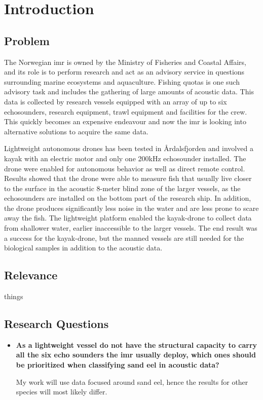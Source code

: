 \chapter{Introduction}


    \section{Problem}
    
    
    
    The Norwegian \gls{imr} is owned by the Ministry of Fisheries and Coastal Affairs, and its role is to perform research and act as an advisory service in questions surrounding marine ecosystems and aquaculture\cite{IMR}. Fishing quotas is one such advisory task and includes the gathering of large amounts of acoustic data. This data is collected by research vessels\cite{IMR-vessels} equipped with an array of up to six echosounders, research equipment, trawl equipment and facilities for the crew. This quickly becomes an expensive endeavour and now the \gls{imr} is looking into alternative solutions to acquire the same data. 
    
    Lightweight autonomous drones\cite{johnsen2020measuring} has been tested in Årdalsfjorden and involved a kayak with an electric motor and only one 200kHz echosounder installed. The drone were enabled for autonomous behavior as well as direct remote control. Results showed that the drone were able to measure fish that usually live closer to the surface in the acoustic 8-meter blind zone of the larger vessels, as the echosounders are installed on the bottom part of the research ship. In addition, the drone produces significantly less noise in the water and are less prone to scare away the fish. The lightweight platform enabled the kayak-drone to collect data from shallower water, earlier inaccessible to the larger vessels. The end result was a success for the kayak-drone, but the manned vessels are still needed for the biological samples in addition to the acoustic data. 
    
    
    \section{Relevance}
        things

\section{Research Questions}
    \begin{itemize}
        \item \textbf{As a lightweight vessel do not have the structural capacity to carry all the six echo sounders the \gls{imr} usually deploy, which ones should be prioritized when classifying sand eel in acoustic data?}
        
        My work will use data focused around sand eel, hence the results for other species will most likely differ.
    \end{itemize}



